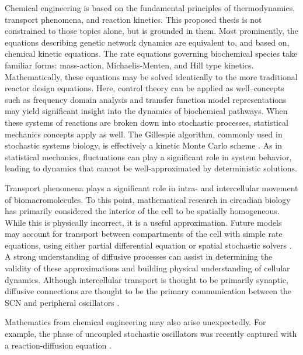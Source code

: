Chemical engineering is based on the fundamental principles of thermodynamics, transport phenomena, and reaction kinetics.
This proposed thesis is not constrained to those topics alone, but is grounded in them.
Most prominently, the equations describing genetic network dynamics are equivalent to, and based on, chemical kinetic equations.
The rate equations governing biochemical species take familiar forms: mass-action, Michaelis-Menten, and Hill type kinetics.
Mathematically, these equations may be solved identically to the more traditional reactor design equations.
Here, control theory can be applied as well--concepts such as frequency domain analysis and transfer function model representations may yield significant insight into the dynamics of biochemical pathways.
When these systems of reactions are broken down into stochastic processes, statistical mechanics concepts apply as well.
The Gillespie algorithm, commonly used in stochastic systems biology, is effectively a kinetic Monte Carlo scheme \cite{Gillespie1977}.
As in statistical mechanics, fluctuations can play a significant role in system behavior, leading to dynamics that cannot be well-approximated by deterministic solutions.

Transport phenomena plays a significant role in intra- and intercellular movement of biomacromolecules.
To this point, mathematical research in circadian biology has primarily considered the interior of the cell to be spatially homogeneous.
While this is physically incorrect, it is a useful approximation.
Future models may account for transport between compartments of the cell with simple rate equations, using either partial differential equation or spatial stochastic solvers \cite{Drawert2012}.
A strong understanding of diffusive processes can assist in determining the validity of these approximations and building physical understanding of cellular dynamics.
Although intercellular transport is thought to be primarily synaptic, diffusive connections are thought to be the primary communication between the SCN and peripheral oscillators \cite{Silver1996}.

Mathematics from chemical engineering may also arise unexpectedly.
For example, the phase of uncoupled stochastic oscillators was recently captured with a reaction-diffusion equation \cite{StJohn2014b}.



